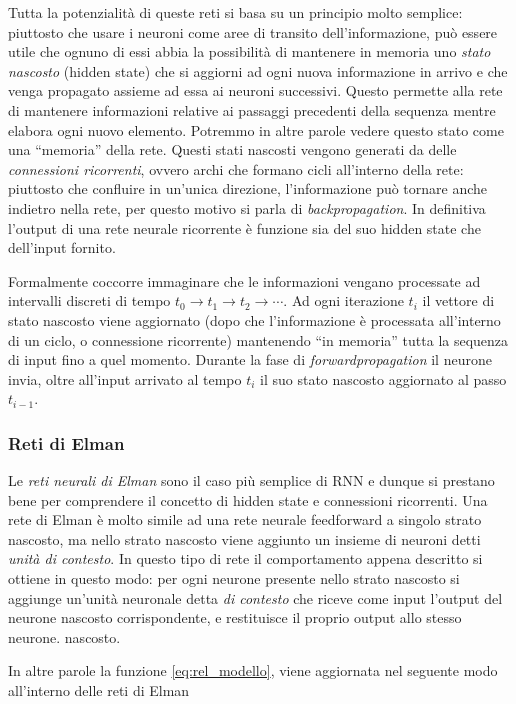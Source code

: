 \documentclass[12pt,a4paper,twoside,openright]{book}
\begin{document}
Tutta la potenzialità di queste reti si basa su un principio molto semplice: piuttosto che usare i neuroni come aree di transito dell'informazione, può essere utile che ognuno di essi abbia la possibilità di mantenere in memoria uno \emph{stato nascosto} (hidden state) che si aggiorni ad ogni nuova informazione in arrivo e che venga propagato assieme ad essa ai neuroni successivi. 
Questo permette alla rete di mantenere informazioni relative ai passaggi precedenti della sequenza mentre elabora ogni nuovo elemento. Potremmo in altre parole vedere questo stato come una ``memoria'' della rete.
Questi stati nascosti vengono generati da delle \emph{connessioni ricorrenti}, ovvero archi che formano cicli all'interno della rete: piuttosto che confluire in un'unica direzione, l'informazione può tornare anche indietro nella rete, per questo motivo si parla di \emph{backpropagation}.
In definitiva l'output di una rete neurale ricorrente è funzione sia del suo hidden state che dell'input fornito.

Formalmente coccorre immaginare che le informazioni vengano processate ad intervalli discreti di tempo $t_0 \rightarrow t_1 \rightarrow t_2 \rightarrow \cdots$.
Ad ogni iterazione $t_i$ il vettore di stato nascosto viene aggiornato (dopo che l'informazione è processata all'interno di un ciclo, o connessione ricorrente) mantenendo ``in memoria'' tutta la sequenza di input fino a quel momento. Durante la fase di \emph{forwardpropagation} il neurone invia, oltre all'input arrivato al tempo $t_i$ il suo stato nascosto aggiornato al passo $t_{i-1}$. 

\subsubsection{Reti di Elman}
Le \emph{reti neurali di Elman} sono il caso più semplice di RNN e dunque si prestano bene per comprendere il concetto di hidden state e connessioni ricorrenti.
Una rete di Elman è molto simile ad una rete neurale feedforward a singolo strato nascosto, ma nello strato nascosto viene aggiunto un insieme di neuroni detti \emph{unità di contesto}.
In questo tipo di rete il comportamento appena descritto si ottiene in questo modo: per ogni neurone presente nello strato nascosto
si aggiunge un’unità neuronale detta \emph{di contesto} che riceve come input l’output del neurone nascosto corrispondente, e restituisce il proprio output allo stesso neurone.
nascosto.

In altre parole la funzione \ref{eq:rel_modello}, viene aggiornata nel seguente modo all'interno delle reti di Elman
\end{document}
